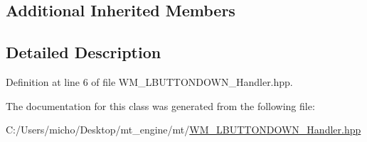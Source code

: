 \subsection*{Additional Inherited Members}


\subsection{Detailed Description}


Definition at line 6 of file W\+M\+\_\+\+L\+B\+U\+T\+T\+O\+N\+D\+O\+W\+N\+\_\+\+Handler.\+hpp.



The documentation for this class was generated from the following file\+:\begin{DoxyCompactItemize}
\item 
C\+:/\+Users/micho/\+Desktop/mt\+\_\+engine/mt/\hyperlink{_w_m___l_b_u_t_t_o_n_d_o_w_n___handler_8hpp}{W\+M\+\_\+\+L\+B\+U\+T\+T\+O\+N\+D\+O\+W\+N\+\_\+\+Handler.\+hpp}\end{DoxyCompactItemize}
